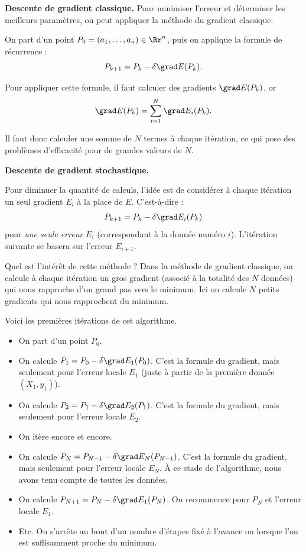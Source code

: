 \bigskip

\textbf{Descente de gradient classique.}
Pour minimiser l'erreur et déterminer les meilleurs paramètres, on peut appliquer la méthode du gradient classique.

On part d'un point $P_0 = (a_1,\ldots,a_n) \in \Rr^n$, puis on applique la formule de récurrence :
$$P_{k+1} = P_k - \delta \grad E (P_k).$$


Pour appliquer cette formule, il faut calculer des gradients $\grad E(P_k)$, or
$$\grad E(P_k) = \sum_{i=1}^N \grad E_i(P_k).$$

Il faut donc calculer une somme de $N$ termes à chaque itération, ce qui pose des problèmes d'efficacité pour de grandes valeurs de $N$.

\bigskip

\textbf{Descente de gradient stochastique.}

Pour diminuer la quantité de calculs, l'idée est de considérer à chaque itération un seul gradient $E_i$ à la place de $E$. C'est-à-dire : 
$$P_{k+1} = P_k - \delta \grad E_i (P_k)$$
pour \emph{une seule erreur $E_i$} (correspondant à la donnée numéro $i$).
L'itération suivante se basera sur l'erreur $E_{i+1}$.


Quel est l'intérêt de cette méthode ? 
Dans la méthode de gradient classique, on calcule à chaque itération un \og{}gros\fg{} gradient (associé à la totalité des $N$ données) qui nous rapproche d'un grand pas vers le minimum.
Ici on calcule $N$ \og{}petits\fg{} gradients qui nous rapprochent du minimum.%





Voici les premières itérations de cet algorithme.
\begin{itemize}
	\item On part d'un point $P_0$.
	
	\item On calcule $P_1 = P_0 - \delta \grad E_1 (P_0)$. C'est la formule du gradient, mais seulement pour l'erreur locale $E_1$ (juste à partir de la première donnée $(X_1,y_1)$).
	
	\item On calcule $P_2 = P_1 - \delta \grad E_2 (P_1)$. C'est la formule du gradient, mais seulement pour l'erreur locale $E_2$.
	
	\item On itère encore et encore.
	
	\item On calcule $P_{N} = P_{N-1} - \delta \grad E_N (P_{N-1})$. C'est la formule du gradient, mais seulement pour l'erreur locale $E_N$. À ce stade de l'algorithme, nous avons tenu compte de toutes les données. 
	
	\item On calcule $P_{N+1} = P_{N} - \delta \grad E_1 (P_{N})$. On recommence pour $P_N$ et l'erreur locale $E_1$.
	
	\item Etc. On s'arrête au bout d'un nombre d'étapes fixé à l'avance ou lorsque l'on est suffisamment proche du minimum.   
\end{itemize}


